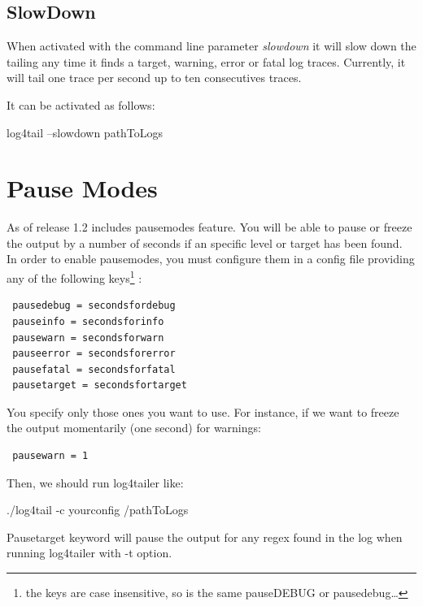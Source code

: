 \subsection{SlowDown}
\label{sec:slowdown}

When activated with the command line parameter \emph{slowdown} it will slow
down the tailing any time it finds a target, warning, error or fatal log
traces. Currently, it will tail one trace per second up to ten consecutives
traces.

It can be activated as follows:

\begin{cmd}
 log4tail --slowdown pathToLogs
\end{cmd}


\section{Pause Modes}
\label{sec:PauseModes}
As of release 1.2 \logftailer{} includes pausemodes feature. You will be able
to pause or freeze the output by a number of seconds if an specific level or
target has been found. In order to enable pausemodes, you must configure them
in a config file providing any of the following keys\footnote{the keys are case
insensitive, so is the same pauseDEBUG or pausedebug\ldots} :

\begin{config}
\begin{verbatim}
 pausedebug = secondsfordebug
 pauseinfo = secondsforinfo
 pausewarn = secondsforwarn
 pauseerror = secondsforerror
 pausefatal = secondsforfatal
 pausetarget = secondsfortarget
\end{verbatim}
\end{config}

\noindent
You specify only those ones you want to use.
For instance, if we want to freeze the output momentarily (one second) for warnings:

\begin{config}
\begin{verbatim}
 pausewarn = 1
\end{verbatim}
\end{config}

\noindent
Then, we should run log4tailer like:
\begin{cmd}
./log4tail -c yourconfig /pathToLogs
\end{cmd}
Pausetarget keyword will pause the output for any regex found in the log when
running log4tailer with -t option.


